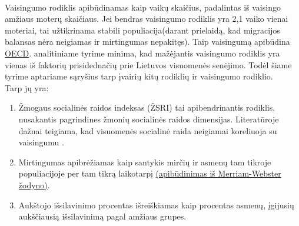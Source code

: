 \paragraph{} Vaisingumo rodiklis apibūdinamas kaip vaikų skaičius, padalintas iš vaisingo amžiaus moterų skaičiaus. Jei bendras vaisingumo rodiklis yra 2,1 vaiko vienai moteriai, tai užtikrinama stabili populiacija(darant prielaidą, kad migracijos balansas nėra neigiamas ir mirtingumas nepakitęs). Taip vaisingumą apibūdina \hyperlink{oecd}{OECD}.
\hypertarget{sen_lt_vis}{\textcite{sensltvis}} analitiniame tyrime minima, kad mažėjantis vaisingumo rodiklis yra vienas iš faktorių prisidednačių prie Lietuvos visuomenės senėjimo.
Todėl šiame tyrime aptariame sąryšius tarp įvairių kitų rodiklių ir vaisingumo rodiklio. \\
Tarp jų yra:
\begin{enumerate}
    \item Žmogaus socialinės raidos indeksas (ŽSRI) tai apibendrinantis rodiklis, nusakantis pagrindines žmonių socialinės raidos dimensijas. Literatūroje dažnai teigiama, kad visuomenės socialinė raida neigiamai koreliuoja su vaisingumu \textcite{nargund2009declining}.
    \item Mirtingumas apibrėžiamas kaip santykis mirčių ir asmenų tam tikroje populiacijoje per tam tikrą laikotarpį \hyperlink{merriam}{(apibūdinimas iš Merriam-Webster žodyno)}. 
    \item Aukštojo išsilavinimo procentas išreiškiamas kaip procentas asmenų, įgijusių aukščiausią išsilavinimą pagal amžiaus grupes.
\end{enumerate}